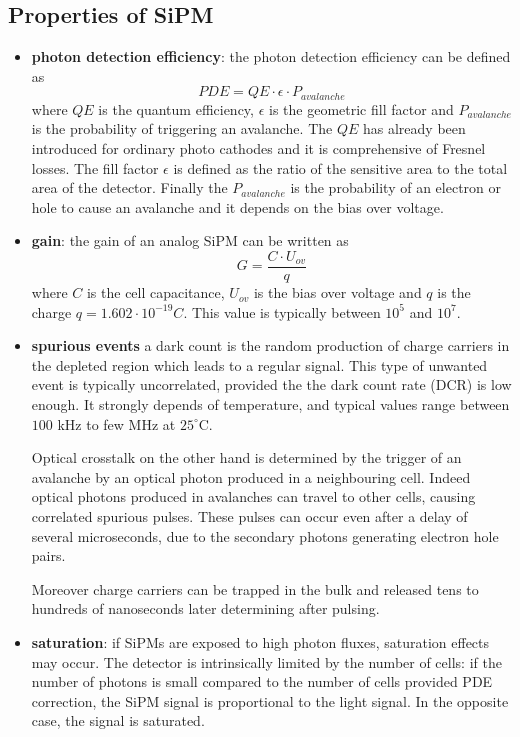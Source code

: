 \subsection{Properties of SiPM}
\begin{itemize}
\item \textbf{photon detection efficiency}: the photon detection efficiency can be defined as
\begin{equation}
PDE = QE \cdot \epsilon \cdot P_{avalanche}
\end{equation}
where $QE$ is the quantum efficiency, $\epsilon$ is the geometric fill factor and $P_{avalanche}$ is the probability of triggering an avalanche.
The $QE$ has already been introduced for ordinary photo cathodes and it is comprehensive of Fresnel losses.
The fill factor $\epsilon$ is defined as the ratio of the sensitive area to the total area of the detector.
Finally the $P_{avalanche}$ is the probability of an electron or hole to cause an avalanche and it depends on the bias over voltage.

\item \textbf{gain}: the gain of an analog SiPM can be written as
\begin{equation}
G = \frac{C\cdot U_{ov}}{q}
\end{equation}
where $C$ is the cell capacitance, $U_{ov}$ is the bias over voltage and $q$ is the charge $q = 1.602 \cdot 10^{-19} C$.
This value is typically between $10^{5}$ and $10^{7}$.

\item \textbf{spurious events} a dark count is the random production of charge carriers in the depleted region which leads to a regular signal. This type of unwanted event is typically uncorrelated, provided the the dark count rate (DCR) is low enough. It strongly depends of temperature, and typical values range between $100$ kHz to few MHz at $25^{\circ}$C.

Optical crosstalk on the other hand is determined by the trigger of an avalanche by an optical photon produced in a neighbouring cell. Indeed optical photons produced in avalanches can travel to other cells, causing correlated spurious pulses. These pulses can occur even after a delay of several microseconds, due to the secondary photons generating electron hole pairs.

Moreover charge carriers can be trapped in the bulk and released tens to hundreds of nanoseconds later determining after pulsing.

\item \textbf{saturation}: if SiPMs are exposed to high photon fluxes, saturation effects may occur. The detector is intrinsically limited by the number of cells: if the number of photons is small compared to the number of cells provided PDE correction, the SiPM signal is proportional to the light signal. In the opposite case, the signal is saturated.
\end{itemize}

